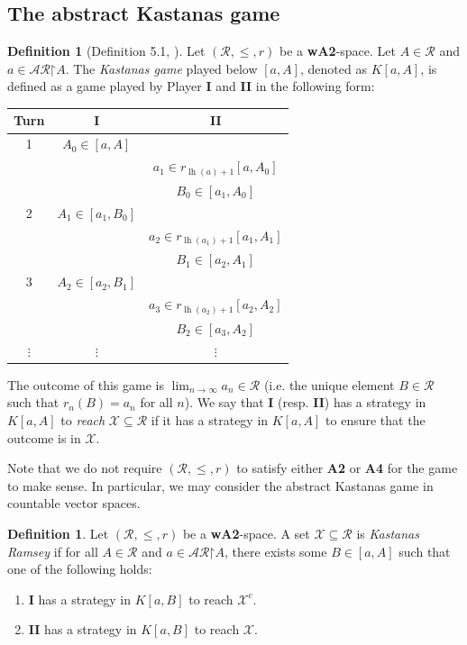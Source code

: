 \documentclass[11pt,reqno]{amsart}
\theoremstyle{plain}
\numberwithin{equation}{section}
\theoremstyle{definition}
\newtheorem{definition}[theorem]{Definition}
\newcommand{\func}{\operatorname}
\newcommand{\cal}{\mathcal}
\newcommand{\restrictedto}{\mathord{\upharpoonright}}
\newcommand{\X}{\cal{X}}
\newcommand{\lh}{\func{lh}}
\begin{document}
\subsection{The abstract Kastanas game}
\begin{definition}[Definition 5.1, \cite{CD23}]
\label{def:kastanas.game}
    Let $(\cal{R},\leq,r)$ be a \textbf{wA2}-space. Let $A \in \cal{R}$ and $a \in \cal{AR}\restrictedto A$. The \emph{Kastanas game} played below $[a,A]$, denoted as $K[a,A]$, is defined as a game played by Player \textbf{I} and \textbf{II} in the following form:
    \begin{center}
        \begin{tabular}{c|c|c}
            Turn & \textbf{I} & \textbf{II} \\
            \hline
            1 & $A_0 \in [a,A]$ & \\
            & & $a_1 \in r_{\lh(a)+1}[a,A_0]$ \\
            & & $B_0 \in [a_1,A_0]$ \\
            \hline
            2 & $A_1 \in [a_1,B_0]$ & \\
            & & $a_2 \in r_{\lh(a_1)+1}[a_1,A_1]$ \\
            & & $B_1 \in [a_2,A_1]$ \\
            \hline
            3 &  $A_2 \in [a_2,B_1]$ & \\
            & & $a_3 \in r_{\lh(a_2)+1}[a_2,A_2]$ \\
            & & $B_2 \in [a_3,A_2]$ \\
            \hline
            $\vdots$ & $\vdots$ & $\vdots$
        \end{tabular}
    \end{center}
    The outcome of this game is $\lim_{n \to \infty} a_n \in \cal{R}$ (i.e. the unique element $B \in \cal{R}$ such that $r_n(B) = a_n$ for all $n$). We say that \textbf{I} (resp. \textbf{II}) has a strategy in $K[a,A]$ to \emph{reach} $\X \subseteq \cal{R}$ if it has a strategy in $K[a,A]$ to ensure that the outcome is in $\X$. 
\end{definition}

Note that we do not require $(\cal{R},\leq,r)$ to satisfy either \textbf{A2} or \textbf{A4} for the game to make sense. In particular, we may consider the abstract Kastanas game in countable vector spaces.

\begin{definition}
\label{def:kastanas.ramsey}
    Let $(\cal{R},\leq,r)$ be a \textbf{wA2}-space. A set $\X \subseteq \cal{R}$ is \emph{Kastanas Ramsey} if for all $A \in \cal{R}$ and $a \in \cal{AR}\restrictedto A$, there exists some $B \in [a,A]$ such that one of the following holds:
    \begin{enumerate}
        \item \textbf{I} has a strategy in $K[a,B]$ to reach $\X^c$.

        \item \textbf{II} has a strategy in $K[a,B]$ to reach $\X$.
    \end{enumerate}
\end{definition}
\end{document}
